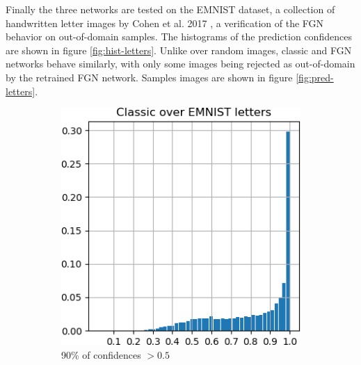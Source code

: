 \documentclass[12pt,oneside]{CUNY_PhD}
\begin{document}
Finally the three networks are tested on the EMNIST dataset, a collection of handwritten letter images by Cohen et al. 2017 \cite{cohen2017emnist}, a verification of the FGN behavior on out-of-domain samples. The histograms of the prediction confidences are shown in figure \ref{fig:hist-letters}. Unlike over random images, classic and FGN networks behave similarly, with only some images being rejected as out-of-domain by the retrained FGN network. Samples images are shown in figure \ref{fig:pred-letters}.
\begin{figure}[!h]
    \centering
    \begin{subfigure}[t]{0.32\textwidth}
        \includegraphics[width=\textwidth]{images/mnist-behavior/classic-hist-emnist.png}
        \caption*{90\%  of confidences $>0.5$}
    \end{subfigure}
    \begin{subfigure}[t]{0.32\textwidth}

\end{subfigure}
\end{figure}
\end{document}
